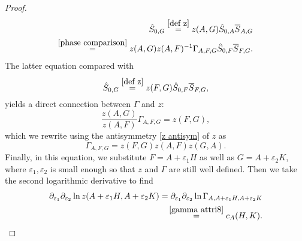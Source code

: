 \documentclass[b5paper,draft,openbib,12pt]{memoir}
\begin{document}
\begin{proof}
\begin{align}
\hat{S}_{0,G}\overset{\eqref{def z}}{=}z(A,G)\hat{S}_{0,A}\overline{S}_{A,G}\\
\overset{\eqref{phase comparison}}{=}z(A,G)z(A,F)^{-1}\Gamma_{A,F,G}\hat{S}_{0,F}\overline{S}_{F,G}.
\end{align}
The latter equation compared with 
\begin{equation}
\hat{S}_{0,G}\overset{\eqref{def z}}{=}z(F,G)\hat{S}_{0,F}\overline{S}_{F,G},
\end{equation}
yields  a direct connection between \(\Gamma\) and \(z\):
\begin{equation}
\frac{z(A,G)}{z(A,F)}\Gamma_{A,F,G}=z(F,G),
\end{equation}
which we rewrite using the antisymmetry 
\eqref{z antisym} of \(z\)  as
\begin{equation}
\Gamma_{A,F,G}=z(F,G)z(A,F)z(G,A).
\end{equation}
Finally, in this equation, we substitute 
\(F=A+\varepsilon_1 H\) as well as  
\(G=A+\varepsilon_2 K\), where 
\(\varepsilon_1,\varepsilon_2\) is small enough so that 
\(z\) and \(\Gamma\) are still well defined. Then we 
take the second logarithmic derivative to find
\begin{align}\notag
 \partial_{\varepsilon_1}\partial_{\varepsilon_2}\ln  z(A+\varepsilon_1 H,A+\varepsilon_2 K)=\partial_{\varepsilon_1}\partial_{\varepsilon_2}\ln\Gamma_{A,A+\varepsilon_1 H,A+\varepsilon_2 K}\\
 \overset{\eqref{gamma attri8}}{=}c_A(H,K). 
\end{align}

\end{proof}
\end{document}
